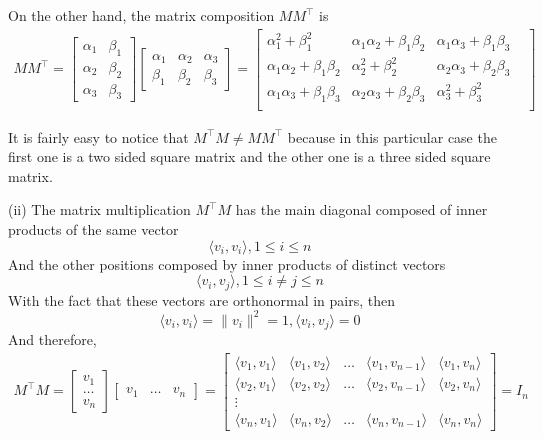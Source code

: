 \documentclass[11pt,reqno,a4paper]{amsart}
\newcommand{\inner}[2]{\langle #1,#2 \rangle}
\newcommand{\norm}[1]{\lVert #1 \rVert}
\begin{document}
On the other hand, the matrix composition $M M^\intercal$ is
\begin{align*}
    M M^\intercal = 
    \begin{bmatrix}
        \alpha_1 & \beta_1\\
        \alpha_2 & \beta_2\\
        \alpha_3 & \beta_3
    \end{bmatrix}
    \begin{bmatrix}
        \alpha_1 & \alpha_2 & \alpha_3\\
        \beta_1 & \beta_2 & \beta_3
    \end{bmatrix}
    =
    \begin{bmatrix}
        \alpha_1^2 + \beta_1^2 & \alpha_1 \alpha_2 + \beta_1 \beta_2 & \alpha_1 \alpha_3 + \beta_1 \beta_3\\
        \alpha_1 \alpha_2 + \beta_1 \beta_2 & \alpha_2^2 + \beta_2^2 &  \alpha_2 \alpha_3 + \beta_2 \beta_3\\
        \alpha_1 \alpha_3 + \beta_1 \beta_3 & \alpha_2 \alpha_3 + \beta_2 \beta_3 & \alpha_3^2 + \beta_3^2 &\\
    \end{bmatrix}
\end{align*}

It is fairly easy to notice that $M^\intercal M \neq M M^\intercal$ because in this particular case the first one is a two sided square matrix and the other one is a three sided square matrix.

\hrulefill

(ii) The matrix multiplication $M^\intercal M$ has the main diagonal composed of inner products of the same vector
\[
    \inner{v_i}{v_i}, 1 \leq i \leq n
\]
And the other positions composed by inner products of distinct vectors
\[
    \inner{v_i}{v_j}, 1 \leq i \neq j \leq n
\]
With the fact that these vectors are orthonormal in pairs, then
\[\inner{v_i}{v_i} = \norm{v_i}^2 = 1 , \inner{v_i}{v_j} = 0 \]
And therefore,
\begin{align*}
    M^\intercal M =
    \left[
    \begin{array}{ccc}
        v_1 \\
        \hline
        \dots\\
        \hline
        v_n    
    \end{array}
    \right]
    \left[
    \begin{array}{c|c|c}
       v_1 & \dots & v_n 
    \end{array}
    \right]
    =
    \begin{bmatrix}
        \inner{v_1}{v_1} & \inner{v_1}{v_2} & \dots & \inner{v_1}{v_{n-1}} & \inner{v_1}{v_n}\\
        \inner{v_2}{v_1} & \inner{v_2}{v_2} & \dots & \inner{v_2}{v_{n-1}} & \inner{v_2}{v_n}\\
        \vdots\\
        \inner{v_n}{v_1} & \inner{v_n}{v_2} & \dots & \inner{v_n}{v_{n-1}} & \inner{v_n}{v_n}
    \end{bmatrix}
    =
    I_n
\end{align*}
\end{document}
